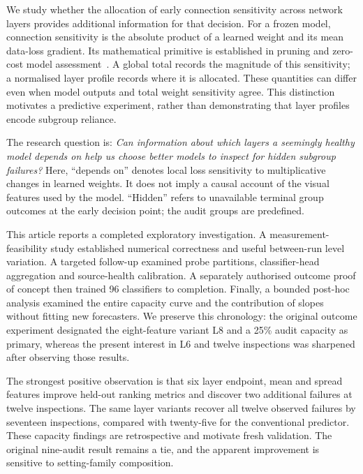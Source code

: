 \documentclass[nolineno]{ieeeaccess}
\begin{document}
We study whether the allocation of early connection sensitivity across network layers provides additional information for that decision. For a frozen model, connection sensitivity is the absolute product of a learned weight and its mean data-loss gradient. Its mathematical primitive is established in pruning and zero-cost model assessment~\cite{snip,zerocost}. A global total records the magnitude of this sensitivity; a normalised layer profile records where it is allocated. These quantities can differ even when model outputs and total weight sensitivity agree. This distinction motivates a predictive experiment, rather than demonstrating that layer profiles encode subgroup reliance.

The research question is: \emph{Can information about which layers a seemingly healthy model depends on help us choose better models to inspect for hidden subgroup failures?} Here, ``depends on'' denotes local loss sensitivity to multiplicative changes in learned weights. It does not imply a causal account of the visual features used by the model. ``Hidden'' refers to unavailable terminal group outcomes at the early decision point; the audit groups are predefined.

This article reports a completed exploratory investigation. A measurement-feasibility study established numerical correctness and useful between-run level variation. A targeted follow-up examined probe partitions, classifier-head aggregation and source-health calibration. A separately authorised outcome proof of concept then trained 96 classifiers to completion. Finally, a bounded post-hoc analysis examined the entire capacity curve and the contribution of slopes without fitting new forecasters. We preserve this chronology: the original outcome experiment designated the eight-feature variant L8 and a 25\% audit capacity as primary, whereas the present interest in L6 and twelve inspections was sharpened after observing those results.

The strongest positive observation is that six layer endpoint, mean and spread features improve held-out ranking metrics and discover two additional failures at twelve inspections. The same layer variants recover all twelve observed failures by seventeen inspections, compared with twenty-five for the conventional predictor. These capacity findings are retrospective and motivate fresh validation. The original nine-audit result remains a tie, and the apparent improvement is sensitive to setting-family composition.
\end{document}
